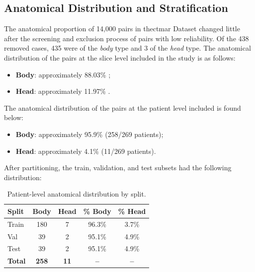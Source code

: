 \subsection{Anatomical Distribution and Stratification}
\label{subsec:results-anatomical-distribution}

The anatomical proportion of 14,000 pairs in the\acrshort{ctmar} Dataset changed little after the screening and exclusion process of pairs with low reliability. Of the 438 removed cases, 435 were of the \textit{body} type and 3 of the \textit{head} type. The anatomical distribution of the pairs at the slice level included in the study is as follows:

\begin{itemize}
    \item \textbf{Body}: approximately 88.03\% ;
    \item \textbf{Head}: approximately 11.97\% .
\end{itemize}

The anatomical distribution of the pairs at the patient level included is found below:
\begin{itemize}
    \item \textbf{Body}: approximately 95.9\% (258/269 patients);
    \item \textbf{Head}: approximately 4.1\% (11/269 patients).
\end{itemize}

After partitioning, the train, validation, and test subsets had the following distribution:
\begin{table}[H]
    \centering
    \begin{tabular}{lcccc}
        \hline
        \textbf{Split} & \textbf{Body} & \textbf{Head}  &\textbf{\% Body} & \textbf{\% Head} \\
        \hline
        Train & 180 & 7 & 96.3\% & 3.7\% \\
        Val   & 39  & 2  & 95.1\% & 4.9\% \\
        Test  & 39  & 2  & 95.1\% & 4.9\% \\
        \hline
        \textbf{Total} & \textbf{258} & \textbf{11} & \textbf{--} & \textbf{--} \\
        \hline
    \end{tabular}
    \captionsetup{skip=2pt}
    \caption[Patient-level anatomical distribution by split]{Patient-level anatomical distribution by split.}
    \label{tab:final-split-anatomic}
\end{table}

